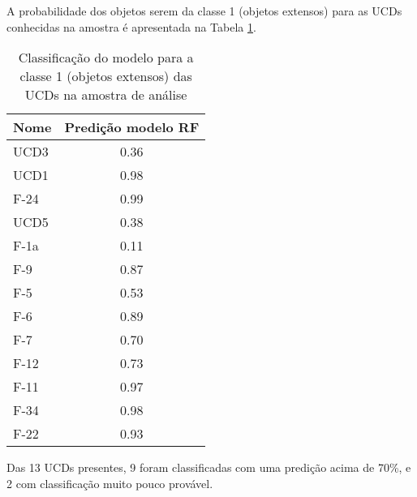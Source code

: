 A probabilidade dos objetos serem da classe 1 (objetos extensos) para as UCDs conhecidas na amostra é apresentada na Tabela \ref{ucds_predict}.

\begin{table}[H]
    \centering
    \caption{Classificação do modelo para a classe 1 (objetos extensos) das UCDs na amostra de análise}  
    \begin{tabular}{lc}
        \toprule
        Nome & Predição modelo RF \\
        \midrule
        UCD3 & 0.36 \\
        UCD1 & 0.98 \\
        F-24 & 0.99 \\
        UCD5 & 0.38 \\
        F-1a & 0.11 \\
        F-9 & 0.87 \\
        F-5 & 0.53 \\
        F-6 & 0.89 \\
        F-7 & 0.70 \\
        F-12 & 0.73 \\
        F-11 & 0.97 \\
        F-34 & 0.98 \\
        F-22 & 0.93 \\
        \bottomrule
    \end{tabular}
    \label{ucds_predict}
\end{table}

Das 13 UCDs presentes, 9 foram classificadas com uma predição acima de 70\%, e 2 com classificação muito pouco provável. 






